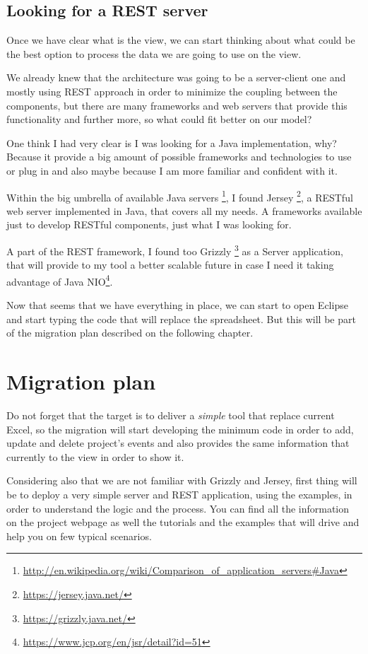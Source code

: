 \section{Looking for a REST server}
Once we have clear what is the view, we can start thinking about what could be
the best option to process the data we are going to use on the view.

We already knew that the architecture was going to be a server-client one and
mostly using REST approach in order to minimize the coupling between the
components, but there are many frameworks and web servers that provide this
functionality and further more, so what could fit better on our model?

One think I had very clear is I was looking for a Java implementation, why?
Because it provide a big amount of possible frameworks and technologies to
use or plug in and also maybe because I am more familiar and confident
with it.

Within the big umbrella of available Java servers
\footnote{\url{http://en.wikipedia.org/wiki/Comparison\_of\_application\_servers\#Java}},
I found Jersey \footnote{\url{https://jersey.java.net/}}, a RESTful web server
implemented in Java, that covers all my needs. A frameworks available just to
develop RESTful components, just what I was looking for.

A part of the REST framework, I found too Grizzly
\footnote{\url{https://grizzly.java.net/}} as a Server application, that will
provide to my tool a better scalable future in case I need it taking
advantage of Java NIO\footnote{\url{https://www.jcp.org/en/jsr/detail?id=51}}.

Now that seems that we have everything in place, we can start to open Eclipse
and start typing the code that will replace the spreadsheet. But this will be
part of the migration plan described on the following chapter.

\chapter{Migration plan}
Do not forget that the target is to deliver a \emph{simple} tool that replace
current Excel, so the migration will start developing the minimum code in order
to add, update and delete project's events and also provides the same
information that currently to the view in order to show it.

Considering also that we are not familiar with Grizzly and Jersey, first thing
will be to deploy a very simple server and REST application, using the examples,
in order to understand the logic and the process. You can find all the
information on the project webpage as well the tutorials and the examples that
will drive and help you on few typical scenarios.

